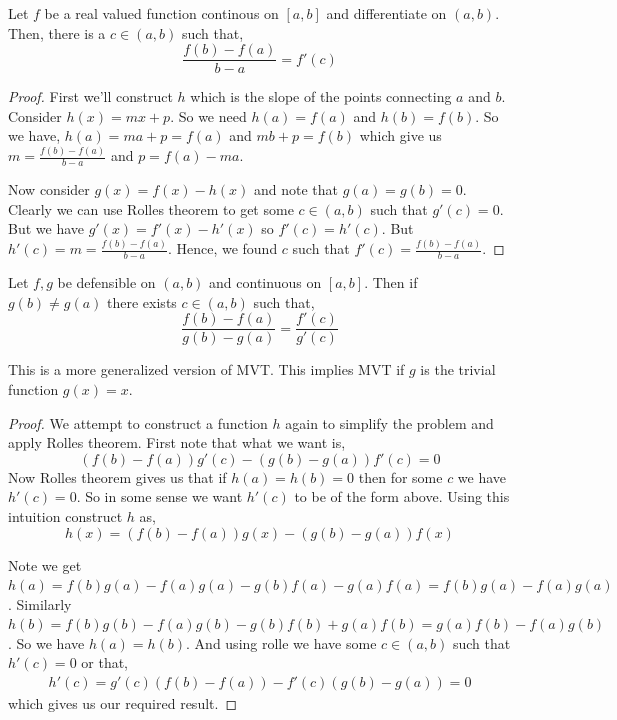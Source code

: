 \begin{theorem}
    Let $f$ be a real valued function continous on $[a, b]$ and differentiate on $(a, b)$. Then, there is a $c \in (a, b)$ such that, 
    \[
        \frac{f(b) - f(a)}{b - a} = f'(c)
    \]
\end{theorem}
\begin{proof}
    First we'll construct $h$ which is the slope of the points connecting $a$ and $b$. Consider $h(x) = mx + p$. So we need $h(a) = f(a)$ and $h(b) = f(b)$. So we have, $h(a) = ma + p = f(a)$ and $mb + p = f(b)$ which give us $m = \frac{f(b) - f(a)}{b - a}$ and $p = f(a) - ma$.

    \vspace{1em}
    
    Now consider $g(x) = f(x) - h(x)$ and note that $g(a) = g(b) = 0$. Clearly we can use Rolles theorem to get some $c \in (a, b)$ such that $g'(c) = 0$. But we have $g'(x) = f'(x) - h'(x)$ so $f'(c) = h'(c)$. But $h'(c) = m = \frac{f(b) - f(a)}{b - a}$. Hence, we found $c$ such that $f'(c) = \frac{f(b) - f(a)}{b - a}$. 
\end{proof}

\begin{theorem}
    Let $f, g$ be defensible on $(a, b)$ and continuous on $[a, b]$. Then if $g(b) \ne g(a)$ there exists $c \in (a, b)$  such that, 
    \[
        \frac{f(b) - f(a)}{g(b) - g(a)} =\frac{f'(c)}{g'(c)}
    \]
\end{theorem}
\begin{note}
    This is a more generalized version  of MVT. This implies MVT if $g$ is the trivial function $g(x) = x$.
\end{note}
\begin{proof}
    We attempt to construct a function $h$ again to simplify the problem and apply Rolles theorem. First note that what we want is, 
    \[
        (f(b) - f(a)) g'(c) - (g(b) - g(a)) f'(c) = 0
    \]
    Now Rolles theorem gives us that if $h(a) = h(b) = 0$ then for some $c$ we have $h'(c) = 0$. So in some sense we want $h'(c)$ to be of the form above. Using this intuition construct $h$ as, 
    \[
        h(x) = (f(b) - f(a)) g(x) - (g(b) - g(a)) f(x)
    \]

    Note we get $h(a) = f(b)g(a) - f(a)g(a) - g(b)f(a) - g(a) f(a) = f(b)g(a) - f(a) g(a)$. Similarly $h(b) = f(b)g(b) - f(a)g(b) - g(b)f(b) + g(a)f(b) = g(a)f(b) - f(a)g(b)$. So we have $h(a) = h(b)$. And using rolle we have some $c \in (a, b)$ such that $h'(c) = 0$ or that, 
    \begin{align*}
        h'(c) = g'(c) (f(b) - f(a)) - f'(c)(g(b) - g(a)) = 0
    \end{align*}
    which gives us our required result.
\end{proof}


